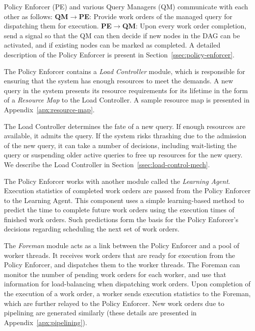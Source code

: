 Policy Enforcer (PE) and various Query Managers (QM) communicate with each other as follows:
\textbf{QM}$\rightarrow$\textbf{PE}: Provide work orders of the managed query for dispatching them for execution.
\textbf{PE}$\rightarrow$\textbf{QM}: Upon every work order completion, send a signal so that the QM can then decide if new nodes in the DAG can be activated, and if existing nodes can be marked as completed.
A detailed description of the Policy Enforcer is present in Section~\ref{ssec:policy-enforcer}. 

The Policy Enforcer contains a \textit{Load Controller} module, which is
responsible for ensuring that the system has enough resources to meet the
demands.
A new query in the system presents its resource requirements for its lifetime in the form of a \textit{Resource Map} to the Load Controller.
A sample resource map is presented in Appendix~\ref{apx:resource-map}.

The Load Controller determines the fate of a new query. 
If enough resources are available, it admits the query.
If the system risks thrashing due to the admission of the new query, it can take a number of decisions, including wait-listing the query or suspending older active queries to free up resources for the new query.
We describe the Load Controller in Section~\ref{ssec:load-control-mech}.

The Policy Enforcer works with another module called the \textit{Learning Agent}. 
Execution statistics of completed work orders are passed from the Policy Enforcer to the Learning Agent.
This component uses a simple learning-based method to predict the time to 
complete future work orders using the execution times of finished work orders. 
Such predictions form the basis for the Policy Enforcer's decisions regarding scheduling the next set of work orders. 

The \textit{Foreman} module acts as a link between the Policy Enforcer and a pool of worker threads. 
It receives work orders that are ready for execution from the Policy Enforcer, and dispatches them to the worker threads. 
The Foreman can monitor the number of pending work orders for each worker, and 
use that information for load-balancing when dispatching work orders.
Upon completion of the execution of a work order, a worker sends execution statistics to the Foreman, which are further relayed to the Policy Enforcer.
New work orders due to pipelining are generated similarly (these details are presented in Appendix~\ref{apx:pipelining}).

